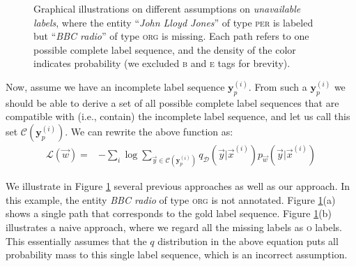 \begin{figure}[h!]
	\caption{Graphical illustrations on different assumptions on {\em unavailable labels}, where the entity ``{\em John Lloyd Jones}'' of type \textsc{per} is labeled but ``{\em BBC radio}'' of type \textsc{org} is missing. Each path refers to one possible complete label sequence, and the density of the color indicates probability (we excluded \textsc{b} and \textsc{e} tags for brevity).}
	\label{fig:nerlabelseq}
\end{figure}


Now, assume we have an incomplete label sequence $\mathbf{y}_p^{(i)}$. From such a $\mathbf{y}_p^{(i)}$ we should be able to derive a set of all possible complete label sequences that are compatible with (i.e., contain) the incomplete label sequence, and let us call this set $\mathcal{C}(\mathbf{y}_p^{(i)})$. 
We can  rewrite the above function as:
\begin{align}
\mathcal{L}(\vec{w}) 
=& 
-
\sum_{i}
\log
\sum_{ \vec{y}\in\mathcal{C}(\mathbf{y}^{(i)}_p) } 
q_{\mathcal{D}} (\vec{y} | \vec{x}^{(i)}) 
p_{\vec{w}} (\vec{y} \vert \vec{x}^{(i)}) 
\nonumber
\label{equ:finalobj3}
\end{align}


We illustrate in Figure \ref{fig:nerlabelseq} several previous approaches as well as our approach. 
In this example, the entity {\em BBC radio} of type \textsc{org} is not annotated.
Figure \ref{fig:nerlabelseq}(a) shows a single path that corresponds to the gold label sequence.
Figure \ref{fig:nerlabelseq}(b) illustrates a naive approach, where we regard all the missing labels as \textsc{o} labels. 
This essentially assumes that the $q$ distribution in the above equation puts all probability mass to this single label sequence, which is an incorrect assumption.   

